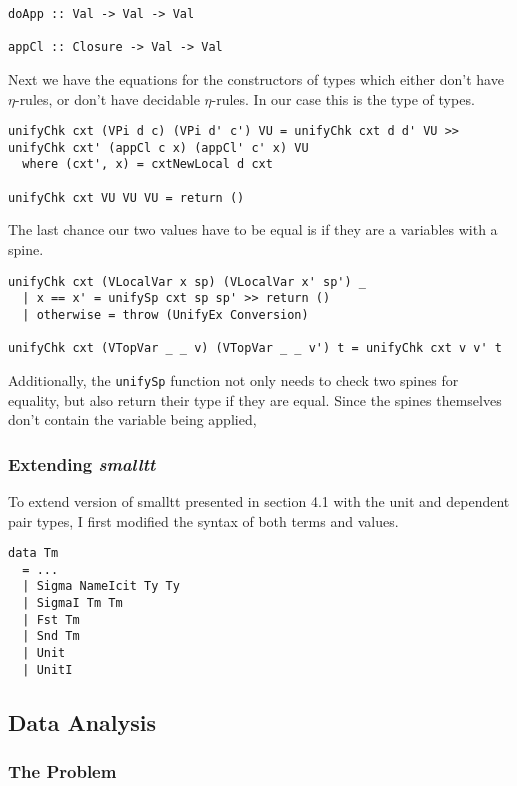 \documentclass{article}
\begin{document}
\begin{lstlisting}
doApp :: Val -> Val -> Val

appCl :: Closure -> Val -> Val
\end{lstlisting}

Next we have the equations for the constructors of types which either don't have $\eta$-rules, or don't have decidable $\eta$-rules.
In our case this is the type of types.

\begin{lstlisting}
unifyChk cxt (VPi d c) (VPi d' c') VU = unifyChk cxt d d' VU >> unifyChk cxt' (appCl c x) (appCl' c' x) VU
  where (cxt', x) = cxtNewLocal d cxt

unifyChk cxt VU VU VU = return ()
\end{lstlisting}

The last chance our two values have to be equal is if they are a variables with a spine.

\begin{lstlisting}
unifyChk cxt (VLocalVar x sp) (VLocalVar x' sp') _
  | x == x' = unifySp cxt sp sp' >> return ()
  | otherwise = throw (UnifyEx Conversion)

unifyChk cxt (VTopVar _ _ v) (VTopVar _ _ v') t = unifyChk cxt v v' t
\end{lstlisting}

Additionally, the \lstinline{unifySp} function not only needs to check two spines for equality, but also return their type if they are equal.
Since the spines themselves don't contain the variable being applied, 

\subsubsection{Extending \textit{smalltt}}

To extend version of smalltt presented in section 4.1 with the unit and dependent pair types, I first modified the syntax of both terms and values.

\begin{lstlisting}
data Tm
  = ...
  | Sigma NameIcit Ty Ty
  | SigmaI Tm Tm
  | Fst Tm
  | Snd Tm
  | Unit
  | UnitI
\end{lstlisting}


\subsection{Data Analysis}

\subsubsection{The Problem}
\end{document}
